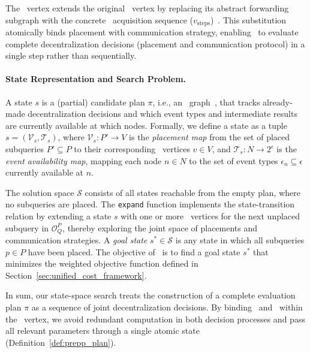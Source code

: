 %
The \we~vertex extends the original \inev~vertex by replacing its abstract forwarding subgraph with the concrete \prepp~acquisition sequence ($v_{\text{steps}}$)~\cite{DBLP:journals/pacmmod/AkiliP023,PushPullSamira}.
%
This substitution atomically binds placement with communication strategy, enabling \we~to evaluate complete decentralization decisions (placement and communication protocol) in a single step rather than sequentially.
%
\paragraph{State Representation and Search Problem.}
%
A state $s$ is a (partial) candidate plan $\pi$, i.e., an \inev~graph~\cite{DBLP:journals/pacmmod/AkiliP023}, that tracks already-made decentralization decisions and which event types and intermediate results are currently available at which nodes.
%
Formally, we define a state as a tuple $s = (\mathcal{V}_s, \mathcal{T}_s)$, where $\mathcal{V}_s: P' \to V$ is the \textit{placement map} from the set of placed subqueries $P' \subseteq P$ to their corresponding \we~vertices $v \in V$, and
%
$\mathcal{T}_s : N \to 2^{\epsilon}$ is the \emph{event availability map}, mapping each node $n \in N$ to the set of event types $\epsilon_n \subseteq \epsilon$ currently available at $n$.
%

The solution space $\mathcal{S}$ consists of all states reachable from the empty plan, where no subqueries are placed.
%
The \texttt{expand} function implements the state-transition relation by extending a state $s$ with one or more \we~vertices for the next unplaced subquery in $\mathcal{O}^P_Q$, thereby exploring the joint space of placements and communication strategies.
%
A \emph{goal state} $s^* \in \mathcal{S}$ is any state in which all subqueries $p \in P$ have been placed.
%
The objective of \we~is to find a goal state $s^*$ that minimizes the weighted objective function defined in Section~\ref{sec:unified_cost_framework}.


In sum, our state-space search treats the construction of a complete evaluation plan $\pi$ as a sequence of joint decentralization decisions.
%
By binding \inev~and \prepp~within the \we~vertex, we avoid redundant computation in both decision processes and pass all relevant parameters through a single atomic state (Definition~\ref{def:prepp_plan}).

